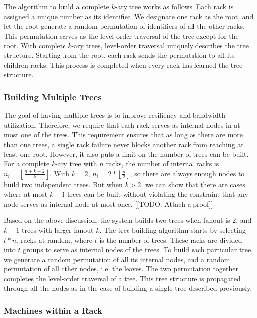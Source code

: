 The algorithm to build a complete $k$-ary tree works as follows.  Each rack is
assigned a unique number as its identifier.  We designate one rack as the root,
and let the root generate a random permutation of identifiers of all the other
racks.  This permutation serves as the level-order traversal of the tree except
for the root.  With complete $k$-ary trees, level-order traversal uniquely
describes the tree structure.  Starting from the root, each rack sends the
permutation to all its children racks.  This process is completed when every
rack has learned the tree structure.

\subsubsection*{Building Multiple Trees}

The goal of having multiple trees is to improve resiliency and bandwidth
utilization.  Therefore, we require that each rack serves as internal nodes in
at most one of the trees.  This requirement ensures that as long as there are
more than one trees, a single rack failure never blocks another rack from
reaching at least one root.  However, it also puts a limit on the number of
trees can be built.  For a complete $k$-ary tree with $n$ racks, the number of
internal racks is $n_i = \left\lfloor\frac{n + k - 2}{k}\right\rfloor$.  With
$k = 2$, $n_i = 2 * \left\lfloor\frac{n}{2}\right\rfloor$, so there are always
enough nodes to build two independent trees.  But when $k > 2$, we can show
that there are cases where at most $k - 1$ trees can be built without violating
the constraint that any node serves as internal node at most once.  [[TODO:
Attach a proof]]

Based on the above discussion, the system builds two trees when fanout is $2$,
and $k - 1$ trees with larger fanout $k$.  The tree building algorithm starts
by selecting $t * n_i$ racks at random, where $t$ is the number of trees.
These racks are divided into $t$ groups to serve as internal nodes of the
trees.  To build each particular tree, we generate a random permutation of all
its internal nodes, and a random permutation of all other nodes, i.e. the
leaves.  The two permutation together completes the level-order traversal of a
tree.  This tree structure is propagated through all the nodes as in the case
of building a single tree described previously.

\subsubsection*{Machines within a Rack}

